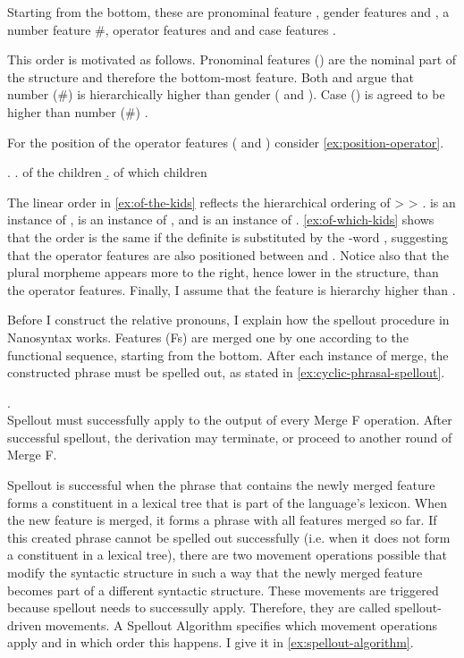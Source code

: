Starting from the bottom, these are pronominal feature , gender features  and , a number feature \#, operator features  and  and case features .

This order is motivated as follows. Pronominal features () are the nominal part of the structure and therefore the bottom-most feature.
Both \citet{picallo2008} and \citet{kramer2016} argue that number (\#) is hierarchically higher than gender ( and ). Case () is agreed to be higher than number (\#) \citep[cf.][]{bittner1996}.

For the position of the operator features ( and ) consider \ref{ex:position-operator}.

\ex.\label{ex:position-operator}
\a.\label{ex:of-the-kids} of the children
\b.\label{ex:of-which-kids} of which children

The linear order in \ref{ex:of-the-kids} reflects the hierarchical ordering of  >  > .  is an instance of ,  is an instance of , and  is an instance of .
\ref{ex:of-which-kids} shows that the order is the same if the definite is substituted by the -word , suggesting that the operator features are also positioned between  and .
Notice also that the plural morpheme  appears more to the right, hence lower in the structure, than the operator features.
Finally, I assume that the feature  is hierarchy higher than  \citep[cf.]{baunaz2018a}.

Before I construct the relative pronouns, I explain how the spellout procedure in Nanosyntax works. Features (Fs) are merged one by one according to the functional sequence, starting from the bottom. After each instance of merge, the constructed phrase must be spelled out, as stated in \ref{ex:cyclic-phrasal-spellout}.

\ex.  \citep{caha2021}\\
Spellout must successfully apply to the output of every Merge F operation. After successful spellout, the derivation may terminate, or proceed to another round of Merge F.\label{ex:cyclic-phrasal-spellout}

Spellout is successful when the phrase that contains the newly merged feature forms a constituent in a lexical tree that is part of the language's lexicon.
When the new feature is merged, it forms a phrase with all features merged so far.
If this created phrase cannot be spelled out successfully (i.e. when it does not form a constituent in a lexical tree), there are two movement operations possible that modify the syntactic structure in such a way that the newly merged feature becomes part of a different syntactic structure.
These movements are triggered because spellout needs to successully apply. Therefore, they are called spellout-driven movements.
A Spellout Algorithm specifies which movement operations apply and in which order this happens. I give it in \ref{ex:spellout-algorithm}.

